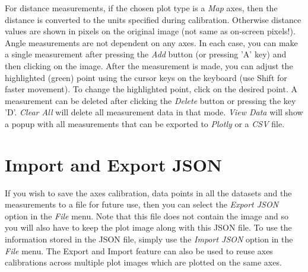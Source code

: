 \documentclass[letterpaper, 10pt]{article}
\begin{document}
For distance measurements, if the chosen plot type is a \emph{Map} axes, then the distance is converted to the units specified during calibration. Otherwise distance values are shown in pixels on the original image (not same as on-screen pixels!). Angle measurements are not dependent on any axes. In each case, you can make a single measurement after pressing the \emph{Add} button (or pressing 'A' key) and then clicking on the image. After the measurement is made, you can adjust the highlighted (green) point using the cursor keys on the keyboard (use Shift for faster movement). To change the highlighted point, click on the desired point. A measurement can be deleted after clicking the \emph{Delete} button or pressing the key 'D'. \emph{Clear All} will delete all measurement data in that mode. \emph{View Data} will show a popup with all measurements that can be exported to \emph{Plotly} or a \emph{CSV} file.

\section{Import and Export JSON}
\label{sec:jsonImportExport}
If you wish to save the axes calibration, data points in all the datasets and the measurements to a file for future use, then you can select the \emph{Export JSON} option in the \emph{File} menu. Note that this file does not contain the image and so you will also have to keep the plot image along with this JSON file. To use the information stored in the JSON file, simply use the \emph{Import JSON} option in the \emph{File} menu. The Export and Import feature can also be used to reuse axes calibrations across multiple plot images which are plotted on the same axes.
\end{document}
